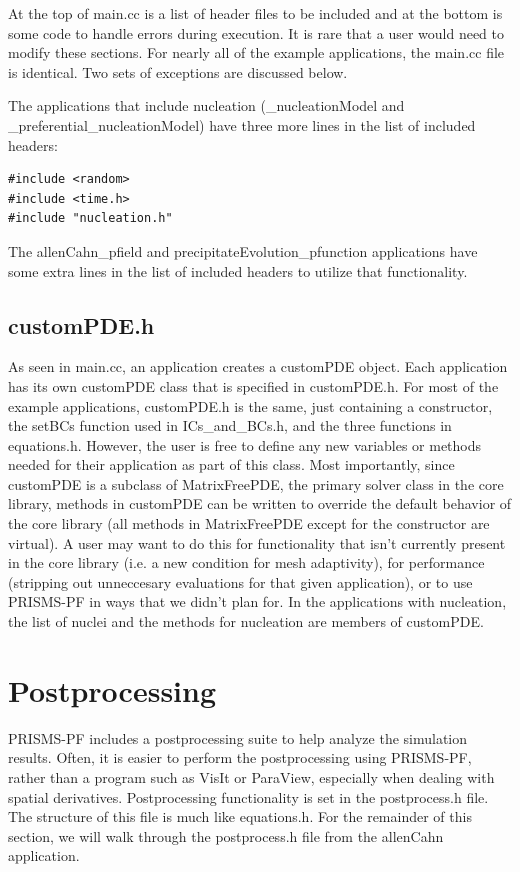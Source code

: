\documentclass[10pt]{article} %
\begin{document}
 At the top of main.cc is a list of header files to be included and at the bottom is some code to handle errors during execution. It is rare that a user would need to modify these sections. For nearly all of the example applications, the main.cc file is identical. Two sets of exceptions are discussed below.
 
 The applications that include nucleation (\_nucleationModel and \_preferential\_nucleationModel) have three more lines in the list of included headers:
 \tiny
\begin{lstlisting} 
#include <random>
#include <time.h>
#include "nucleation.h"
\end{lstlisting}
 \normalsize
 
 The allenCahn\_pfield and precipitateEvolution\_pfunction applications have some extra lines in the list of included headers to utilize that functionality.
 
 \subsection{customPDE.h}
 As seen in main.cc, an application creates a customPDE object. Each application has its own customPDE class that is specified in customPDE.h. For most of the example applications, customPDE.h is the same, just containing a constructor, the setBCs function used in ICs\_and\_BCs.h, and the three functions in equations.h. However, the user is free to define any new variables or methods needed for their application as part of this class. Most importantly, since customPDE is a subclass of MatrixFreePDE, the primary solver class in the core library, methods in customPDE can be written to override the default behavior of the core library (all methods in MatrixFreePDE except for the constructor are virtual). A user may want to do this for functionality that isn't currently present in the core library (i.e. a new condition for mesh adaptivity), for performance (stripping out unneccesary evaluations for that given application), or to use PRISMS-PF in ways that we didn't plan for. In the applications with nucleation, the list of nuclei and the methods for nucleation are members of customPDE.

\section{Postprocessing} \label{postprocessing_sec}
PRISMS-PF includes a postprocessing suite to help analyze the simulation results. Often, it is easier to perform the postprocessing using PRISMS-PF, rather than a program such as VisIt or ParaView, especially when dealing with spatial derivatives. Postprocessing functionality is set in the postprocess.h file. The structure of this file is much like equations.h. For the remainder of this section, we will walk through the postprocess.h file from the allenCahn application.
\end{document}
